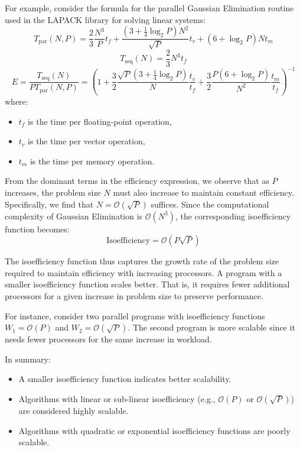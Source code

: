 \documentclass[12pt]{book}
\begin{document}
\begin{itemize}
For example, consider the formula for the parallel Gaussian Elimination routine used in the LAPACK library for solving linear systems:
\[
T_{\text{par}}(N,P) = \frac{2}{3} \frac{N^3}{P} t_f + \frac{(3 + \frac{1}{4} \log_2 P) N^2}{\sqrt{P}} t_v + (6 + \log_2 P) N t_m
\]
\[
T_{\text{seq}}(N) = \frac{2}{3} N^3 t_f
\]
\[
E = \frac{T_{\text{seq}}(N)}{P T_{\text{par}}(N,P)} = \left( 1 + \frac{3}{2} \frac{\sqrt{P}(3 + \frac{1}{4} \log_2 P)}{N} \frac{t_v}{t_f} + \frac{3}{2} \frac{P(6 + \log_2 P)}{N^2} \frac{t_m}{t_f} \right)^{-1}
\]
where:
\begin{itemize}
    \item $t_f$ is the time per floating-point operation,
    \item $t_v$ is the time per vector operation,
    \item $t_m$ is the time per memory operation.
\end{itemize}

From the dominant terms in the efficiency expression, we observe that as $P$ increases, the problem size $N$ must also increase to maintain constant efficiency. Specifically, we find that $N = \mathcal{O}(\sqrt{P})$ suffices. Since the computational complexity of Gaussian Elimination is $\mathcal{O}(N^3)$, the corresponding isoefficiency function becomes:
\[
\text{Isoefficiency} = \mathcal{O}(P \sqrt{P})
\]

The isoefficiency function thus captures the growth rate of the problem size required to maintain efficiency with increasing processors. A program with a smaller isoefficiency function scales better. That is, it requires fewer additional processors for a given increase in problem size to preserve performance.

For instance, consider two parallel programs with isoefficiency functions $W_1 = \mathcal{O}(P)$ and $W_2 = \mathcal{O}(\sqrt{P})$. The second program is more scalable since it needs fewer processors for the same increase in workload.

In summary:
\begin{itemize}
    \item A smaller isoefficiency function indicates better scalability.
    \item Algorithms with linear or sub-linear isoefficiency (e.g., $\mathcal{O}(P)$ or $\mathcal{O}(\sqrt{P})$) are considered highly scalable.
    \item Algorithms with quadratic or exponential isoefficiency functions are poorly scalable.
\end{itemize}

\end{itemize}
    
\end{document}
